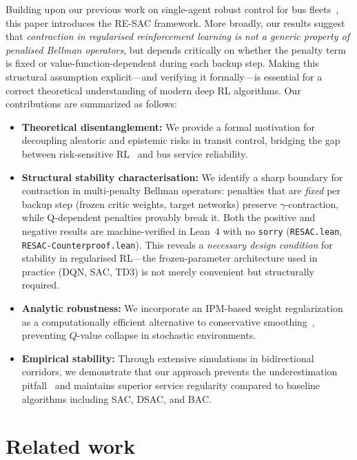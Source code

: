 \documentclass[10pt]{article}
\begin{document}
Building upon our previous work on single-agent robust control for bus fleets~\cite{Zhang2025SingleAgentBus}, this paper introduces the RE-SAC framework.
More broadly, our results suggest that \emph{contraction in regularised reinforcement learning is not a generic property of penalised Bellman operators}, but depends critically on whether the penalty term is fixed or value-function-dependent during each backup step.
Making this structural assumption explicit---and verifying it formally---is essential for a correct theoretical understanding of modern deep RL algorithms.
Our contributions are summarized as follows:
\begin{itemize}
    \item \textbf{Theoretical disentanglement:} We provide a formal motivation for decoupling aleatoric and epistemic risks in transit control, bridging the gap between risk-sensitive RL~\cite{Osogami2012Robustness} and bus service reliability.
    \item \textbf{Structural stability characterisation:} We identify a sharp boundary for contraction in multi-penalty Bellman operators: penalties that are \emph{fixed} per backup step (frozen critic weights, target networks) preserve $\gamma$-contraction, while Q-dependent penalties provably break it.  Both the positive and negative results are machine-verified in Lean~4 with no \texttt{sorry} (\texttt{RESAC.lean}, \texttt{RESAC-Counterproof.lean}).  This reveals a \emph{necessary design condition} for stability in regularised RL---the frozen-parameter architecture used in practice (DQN, SAC, TD3) is not merely convenient but structurally required.
    \item \textbf{Analytic robustness:} We incorporate an IPM-based weight regularization~\cite{Zhou2023NaturalActorCritic} as a computationally efficient alternative to conservative smoothing~\cite{Yang2022RORL}, preventing $Q$-value collapse in stochastic environments.
    \item \textbf{Empirical stability:} Through extensive simulations in bidirectional corridors, we demonstrate that our approach prevents the underestimation pitfall~\cite{Ji2024SeizingSerendipity} and maintains superior service regularity compared to baseline algorithms including SAC, DSAC, and BAC.
\end{itemize}

\section{Related work}
\end{document}

